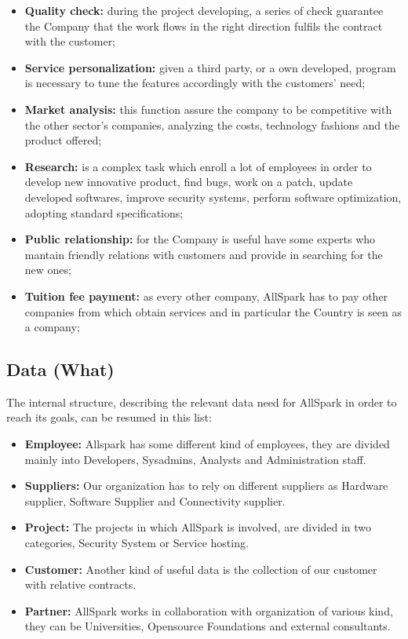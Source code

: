 \begin{itemize}
  \item {\bf Quality check:} during the project developing, a series of check guarantee the Company that the work flows in the right direction fulfils the contract with the customer;
  \item {\bf Service personalization:} given a third party, or a own developed, program is necessary to tune the features accordingly with the customers' need;
  \item {\bf Market analysis:} this function assure the company to be competitive with the other sector's companies, analyzing the costs, technology fashions and the product offered;
  \item {\bf Research:} is a complex task which enroll a lot of employees in order to develop new innovative product, find bugs, work on a patch, update developed softwares, improve security systems, perform software optimization, adopting standard specifications;
  \item {\bf Public relationship:} for the Company is useful have some experts who mantain friendly relations with customers and provide in searching for the new ones;
  \item {\bf Tuition fee payment:} as every other company, AllSpark has to pay other companies from which obtain services and in particular the Country is seen as a company;
\end{itemize}



\subsection{Data (What)}
\label{subsec:enterprise[Data]}



The internal structure, describing the relevant data need for AllSpark in
order to reach its goals, can be resumed in this list:
\begin{itemize}
\item {\bf Employee:} Allspark has some different kind of employees, 
they are divided mainly into Developers, Sysadmins, Analysts and Administration
staff.
\item {\bf Suppliers:} Our organization has to rely on different suppliers as
Hardware supplier, Software Supplier and Connectivity supplier.
\item {\bf Project:} The projects in which AllSpark is involved, are divided
in two categories, Security System or Service hosting.
\item {\bf Customer:} Another kind of useful data is the collection of our 
customer with relative contracts.
\item {\bf Partner:} AllSpark works in collaboration with organization of 
various kind, they can be Universities, Opensource Foundations and external 
consultants.
\end{itemize}

